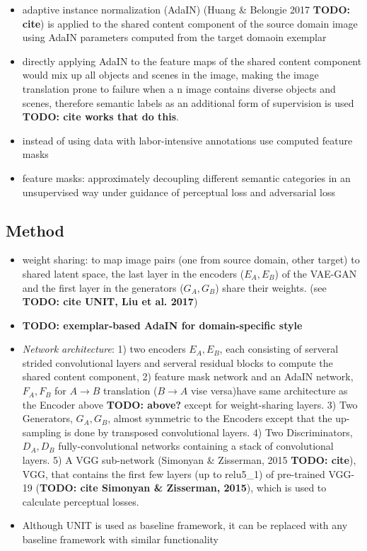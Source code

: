 \documentclass[]{article}
\newcommand{\todo}[1]{{\color{red}\bf{TODO: #1}}}
\begin{document}
\begin{itemize}
	\item adaptive instance normalization (AdaIN) (Huang \& Belongie 2017 \todo{cite}) is applied to the shared content component of the source domain image using AdaIN parameters computed from the target domaoin exemplar
	\item directly applying AdaIN to the feature maps of the shared content component would mix up all objects and scenes in the image, making the image translation prone to failure when a n image contains diverse objects and scenes, therefore semantic labels as an additional form of supervision is used \todo{cite works that do this}. 
	\item instead of using data with labor-intensive annotations use computed feature masks
	\item feature masks: approximately decoupling different semantic categories in an unsupervised way under guidance of perceptual loss and adversarial loss
\end{itemize}

\subsection{Method}
\begin{itemize}
	\item weight sharing: to map image pairs (one from source domain, other target) to shared latent space, the last layer in the encoders ($E_A, E_B$) of the VAE-GAN and the first layer in the generators ($G_A, G_B$)  share their weights. (see \todo{cite UNIT, Liu et al. 2017})
	\item \todo{exemplar-based AdaIN for domain-specific style}
	\item \textit{Network architecture}: 1) two encoders $E_A, E_B$, each consisting of serveral strided convolutional layers and serveral residual blocks to compute the shared content component, 2) feature mask network and an AdaIN network, $F_A, F_B$ for $A \rightarrow B$ translation ($B \rightarrow A$ vise versa)have same architecture as the Encoder above \todo{above?} except for weight-sharing layers. 3) Two Generators, $G_A, G_B$, almost symmetric to the Encoders except that the up-sampling is done by transposed convolutional layers. 4) Two Discriminators, $D_A, D_B$ fully-convolutional networks containing a stack of convolutional layers. 5) A VGG sub-network (Simonyan \& Zisserman, 2015 \todo{cite}), VGG, that contains the first few layers (up to relu5\_1) of pre-trained VGG-19 (\todo{cite Simonyan \& Zisserman, 2015}), which is used to calculate perceptual losses. 
	\item Although UNIT is used as baseline framework, it can be replaced with any baseline framework with similar functionality
\end{itemize}
\end{document}
